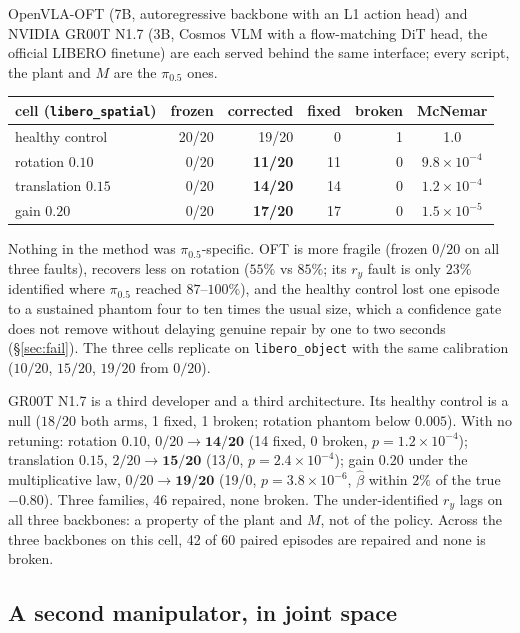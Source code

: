\documentclass{article}
\newcommand{\code}[1]{\texttt{\small #1}}
\begin{document}
OpenVLA-OFT (7B, autoregressive backbone with an L1 action head) and NVIDIA GR00T N1.7
(3B, Cosmos VLM with a flow-matching DiT head, the official LIBERO finetune) are each
served behind the same interface; every script, the plant and $M$ are the $\pi_{0.5}$ ones.

\begin{center}\small
\begin{tabular}{lrrrrc}
\toprule
cell (\code{libero\_spatial}) & frozen & corrected & fixed & broken & McNemar \\
\midrule
healthy control & 20/20 & 19/20 & 0 & 1 & 1.0 \\
rotation $0.10$ & 0/20 & \textbf{11/20} & 11 & 0 & $9.8\times10^{-4}$ \\
translation $0.15$ & 0/20 & \textbf{14/20} & 14 & 0 & $1.2\times10^{-4}$ \\
gain $0.20$ & 0/20 & \textbf{17/20} & 17 & 0 & $1.5\times10^{-5}$ \\
\bottomrule
\end{tabular}
\end{center}

Nothing in the method was $\pi_{0.5}$-specific. OFT is more fragile (frozen $0/20$ on all
three faults), recovers less on rotation ($55\%$ vs $85\%$; its $r_y$ fault is only $23\%$
identified where $\pi_{0.5}$ reached $87$--$100\%$), and the healthy control lost one episode
to a sustained phantom four to ten times the usual size, which a confidence gate does not
remove without delaying genuine repair by one to two seconds (\S\ref{sec:fail}). The three cells
replicate on \code{libero\_object} with the same calibration ($10/20$, $15/20$, $19/20$ from $0/20$).

GR00T N1.7 is a third developer and a third architecture. Its healthy control is a null
($18/20$ both arms, 1 fixed, 1 broken; rotation phantom below $0.005$). With no retuning: rotation $0.10$,
$0/20\to\mathbf{14/20}$ (14 fixed, 0 broken, $p=1.2\times10^{-4}$); translation $0.15$,
$2/20\to\mathbf{15/20}$ (13/0, $p=2.4\times10^{-4}$); gain $0.20$ under the multiplicative
law, $0/20\to\mathbf{19/20}$ (19/0, $p=3.8\times10^{-6}$, $\hat\beta$ within $2\%$ of the
true $-0.80$). Three families, 46 repaired, none broken. The under-identified $r_y$ lags on
all three backbones: a property of the plant and $M$, not of the policy. Across the three
backbones on this cell, 42 of 60 paired episodes are repaired and none is broken.

\subsection{A second manipulator, in joint space}
\label{sec:aloha}
\end{document}
